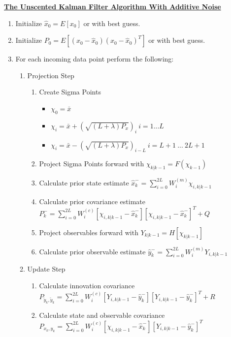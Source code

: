     
    
\begin{tcolorbox}
\doublespacing
\textbf{\underline{The Unscented Kalman Filter Algorithm With Additive Noise}} 
\begin{enumerate}
    \item Initialize $\hat{x}_0 = E[x_0]$ or with best guess.
    \item Initialize $P_0 = E[(x_0 - \hat{x}_0)(x_0 - \hat{x}_0)^T]$ or with best guess.
    \item For each incoming data point perform the following:
    \begin{enumerate}
        \item Projection Step
        \begin{enumerate}
            \item Create Sigma Points 
            \begin{itemize}
                \item  $\chi_0 = \bar{x}$
                \item $ \chi_i = \bar{x} + (\sqrt{(L + \lambda)P_x})_i \ i = 1 ... L $
                \item $ \chi_i = \bar{x} - (\sqrt{(L + \lambda)P_x})_{i - L} \ i = L + 1 \  ...  \ 2L + 1 $
            \end{itemize}
            \item Project Sigma Points forward with $\chi_{k|k-1} = F(\chi_{k-1})$
            \item Calculate prior state estimate $ \hat{x}_k^- = \sum_{i = 0}^{2L} W_i^{(m)} \chi_{i, k|k-1}$
            \item Calculate prior covariance estimate $ P_k^- = \sum_{i = 0}^{2L} W_i^{(c)} [\chi_{i, k|k-1} - \hat{x}_k^-][\chi_{i, k|k-1} - \hat{x}_k^-]^T + Q$
            \item Project observables forward with $Y_{k|k-1} = H[\chi_{k|k-1}]$
            \item Calculate prior observable estimate $\hat{y}_k^- = \sum_{i=0}^{2L} W_i^{(m)} Y_{i,k|k-1}$
        \end{enumerate}
        \item Update Step
        \begin{enumerate}
            \item Calculate innovation covariance $P_{\tilde{y}_k, \tilde{y}_k} = \sum_{i=0}^{2L} W_i^{(c)} [Y_{i,k|k-1} - \hat{y}_k^-][Y_{i,k|k-1} - \hat{y}_k^-]^T + R$
            \item Calculate state and observable covariance $ P_{{x}_k,{y}_k} = \sum_{i=0}^{2L} W_i^{(c)} [\chi_{i,k|k-1} - \hat{x}_k^-][Y_{i,k|k-1} - \hat{y}_k^-]^T$

\end{enumerate}
\end{enumerate}
\end{enumerate}
\end{tcolorbox}
